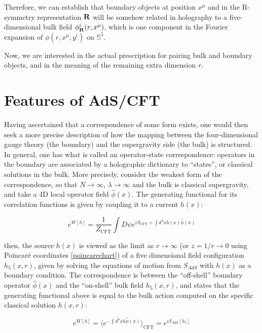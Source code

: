 Therefore, we can establish that boundary objects at position $x^\mu$ and in the R-symmetry representation $\mathbf{R}$ will be somehow related in holography to a five-dimensional bulk field $\phi^i_{\mathbf{R}} (r,x^\mu)$, which is one component in the Fourier expansion of $\phi(r,x^\mu,y^i)$ on $\mathbb{S}^5$.

Now, we are interested in the actual prescription for pairing bulk and boundary objects, and in the meaning of the remaining extra dimension $r$.

\section{Features of AdS/CFT}\label{sec:holofeatures}

Having ascertained that a correspondence of some form exists, one would then seek a more precise description of how the mapping between the four-dimensional gauge theory (the boundary) and the supergravity side (the bulk) is structured. In general, one has what is called an operator-state correspondence: operators in the boundary are associated by a holographic dictionary to ``states'', or classical solutions in the bulk. More precisely, consider the weakest form of the correspondence, so that $N\rightarrow \infty$, $\lambda \rightarrow \infty$ and the bulk is classical supergravity, and take a 4D local operator field $\hat \phi(x)$. The generating functional for its correlation functions is given by coupling it to a current $h(x)$:

\begin{equation}
	e^{W[h]} = \frac{1}{Z_\text{CFT}}\int D\psi e^{i S_\text{CFT} + \int d^4 x h(x) \hat \phi(x)}
\end{equation}

then, the source $h(x)$ is viewed as the limit as $r \rightarrow \infty$ (or $z = 1/r \rightarrow 0$ using Poincar\'e coordinates \eqref{poincarechart}) of a five dimensional field configuration $h_5(x,r)$, given by solving the equations of motion from $S_{AdS}$ with $h(x)$ as a boundary condition. The correspondence is between the ``off-shell'' boundary operator $\hat \phi(x)$ and the ``on-shell'' bulk field $h_5(x,r)$, and states \cite{Witten:adshol} that the generating functional above is equal to the bulk action computed on the specific classical solution $h(x,r)$:

\begin{equation}
	e^{W[h]} = \langle e^{-\int d^4 x h \hat \phi(x)} \rangle_\text{CFT} = e^{iS_{AdS}[h_5]}
	\label{}
\end{equation}

